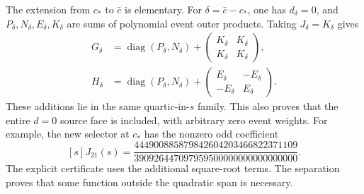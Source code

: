 \documentclass[10pt]{article}
\newcommand{\diag}{\operatorname{diag}}
\begin{document}
The extension from $c_*$ to $\bar c$ is elementary. For $\delta=\bar c-c_*$,
one has $d_\delta=0$, and $P_\delta,N_\delta,E_\delta,K_\delta$ are sums of
polynomial event outer products. Taking $J_\delta=K_\delta$ gives
\begin{align*}
G_\delta&=\diag(P_\delta,N_\delta)
    +\begin{pmatrix}K_\delta&K_\delta\\K_\delta&K_\delta\end{pmatrix},\\
H_\delta&=\diag(P_\delta,N_\delta)
    +\begin{pmatrix}E_\delta&-E_\delta\\-E_\delta&E_\delta\end{pmatrix}.
\end{align*}
These additions lie in the same quartic-in-$s$ family. This also proves that
the entire $d=0$ source face is included, with arbitrary zero event weights.
For example, the new selector at $c_*$ has the nonzero odd coefficient
\[
[s]J_{21}(s)=
\frac{444900885879842604203466822371109}
     {390926447097959500000000000000000}.
\]
The explicit certificate uses the additional square-root terms. The separation proves that some
function outside the quadratic span is necessary.
\end{document}
